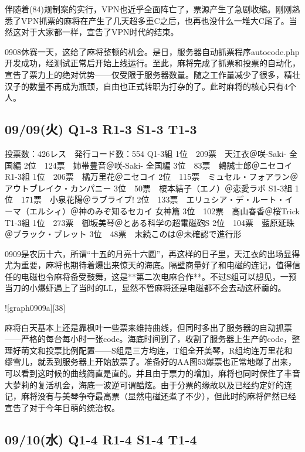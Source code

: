 伴随着(84)规制案的实行，VPN也近乎全面阵亡了，票源产生了急剧收缩。刚刚熟悉了VPN抓票的麻将在产生了几天超多重C之后，也再也没什么一堆大C尾了。当然这对于大家都一样，宣告了VPN时代的结束。

0908休赛一天，这给了麻将整顿的机会。是日，服务器自动抓票程序autocode.php开发成功，经测试正常后开始上线运行。至此，麻将完成了抓票和投票的自动化，宣告了票力上的绝对优势——仅受限于服务器数量。随之工作量减少了很多，精壮汉子的数量不再成为瓶颈，自由也正式转职为打杂的了。此时麻将的核心只有4个人。

\subsection{09/09(火) Q1-3 R1-3 S1-3 T1-3}

	投票数：426レス　発行コード数：554
	Q1-3組
	1位　209票　天江衣＠咲-Saki- 全国編
	2位　124票　姉帯豊音＠咲-Saki- 全国編
	3位　83票　鶫誠士郎＠ニセコイ
	R1-3組
	1位　206票　橘万里花＠ニセコイ
	2位　115票　ミュセル・フォアラン＠アウトブレイク・カンパニー
	3位　50票　榎本結子（エノ）＠恋愛ラボ
	S1-3組
	1位　171票　小泉花陽＠ラブライブ!
	2位　133票　エリュシア・デ・ルート・イーマ（エルシィ）＠神のみぞ知るセカイ 女神篇
	3位　102票　高山春香＠桜Trick
	T1-3組
	1位　273票　御坂美琴＠とある科学の超電磁砲S
	2位　104票　藍原延珠＠ブラック・ブレット
	3位　48票　末続このは＠未確認で進行形

0909是农历十六，所谓“十五的月亮十六圆”，再这样的日子里，天江衣的出场显得尤为重要，麻将也期待着爆出来惊天的海底。隔壁商量好了和电磁的连记，值得信任的电磁也令麻将备受鼓舞，这是**第二次电麻合作**。不过S组可以想见，一预当刀的小爆虾遇上了当时的LL，显然不管麻将还是电磁都不会去动这杯羹的。

![graph0909a][38]

麻将白天基本上还是靠枫叶一些票来维持曲线，但同时多出了服务器的自动抓票——严格的每台每小时一张code。海底时间到了，收割了服务器上生产的code，整理好萌文和投票比例配置——S组是三方均连，T组全开美琴，R组均连万里花和缪雪儿，就丢到服务器上开始放票了。准备好的AA图53爆票也正常地爆了出来，可以看到这时候的曲线简直是直的。并且由于票力的增加，麻将也同时保住了丰音大萝莉的复活机会，海底一波逆可谓酷炫。由于分票的缘故以及已经约定好的连记，麻将没有与美琴争夺最高票（显然电磁还煮了不少），但此时的麻将俨然已经宣告了对于今年日萌的统治权。

\subsection{09/10(水) Q1-4 R1-4 S1-4 T1-4}

